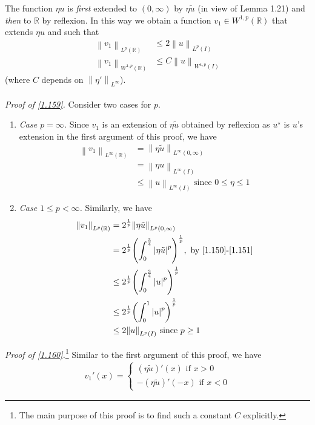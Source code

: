 \documentclass[a4paper,oneside]{article}
\numberwithin{equation}{section}
\begin{document}
The function $\eta u$ is \textit{first} extended to $\left(0,\infty\right)$ by $\eta \tilde{u}$ (in view of Lemma 1.21) and \textit{then} to $\mathbb{R}$ by reflexion. In this way we obtain a function $v_1\in W^{1,p}\left(\mathbb{R}\right)$ that extends $\eta u$ and such that
\begin{align}
\label{1.159}
{\left\| {{v_1}} \right\|_{{L^p}\left( \mathbb{R} \right)}} &\le 2{\left\| u \right\|_{{L^p}\left( I \right)}}\\
{\left\| {{v_1}} \right\|_{{W^{1,p}}\left( \mathbb{R} \right)}} &\le C{\left\| u \right\|_{{W^{1,p}}\left( I \right)}} \label{1.160}
\end{align}
(where $C$ depends on ${{{\left\| {\eta '} \right\|}_{{L^\infty }}}}$).\\
\\
\textit{Proof of \eqref{1.159}.} Consider two cases for $p$.
\begin{enumerate}
\item \textit{Case $p=\infty$.} Since $v_1$ is an extension of $\eta \tilde{u}$ obtained by reflexion as $u^{\star}$ is $u$'s extension in the first argument of this proof, we have 
\begin{align}
{\left\| {{v_1}} \right\|_{{L^\infty }\left( \mathbb{R} \right)}} &= {\left\| {\eta \tilde u} \right\|_{{L^\infty }\left( {0,\infty } \right)}}\\
 &= {\left\| {\eta u} \right\|_{{L^\infty }\left( I \right)}}\\
 &\le {\left\| u \right\|_{{L^\infty }\left( I \right)}}\mbox{ since } 0 \le \eta  \le 1
\end{align}
\item \textit{Case $1\le p <\infty$.}
Similarly, we have 
\begin{align}
{\left\| {{v_1}} \right\|_{{L^p}\left( \mathbb{R} \right)}} &= {2^{\frac{1}{p}}}{\left\| {\eta \tilde u} \right\|_{{L^p}\left( {0,\infty } \right)}}\\
& = {2^{\frac{1}{p}}}{\left( {\int_0^{\frac{3}{4}} {{{\left| {\eta \tilde u} \right|}^p}} } \right)^{\frac{1}{p}}},\mbox{ by \eqref{1.150}-\eqref{1.151}}\\
 &\le {2^{\frac{1}{p}}}{\left( {\int_0^{\frac{3}{4}} {{{\left| u \right|}^p}} } \right)^{\frac{1}{p}}}\\
 &\le {2^{\frac{1}{p}}}{\left( {\int_0^1 {{{\left| u \right|}^p}} } \right)^{\frac{1}{p}}}\\
 &\le 2{\left\| u \right\|_{{L^p}\left( I \right)}}\mbox{ since } p \ge 1
\end{align}
\end{enumerate}
\textit{Proof of \eqref{1.160}.}\footnote{The main purpose of this proof is to find such a constant $C$ explicitly.} Similar to the first argument of this proof, we have
\begin{align}
{v_1}'\left( x \right) = \left\{ {\begin{array}{*{20}{c}}
{\left( {\eta \tilde u} \right)'\left( x \right)\mbox{ if } x > 0}\\
{ - \left( {\eta \tilde u} \right)'\left( { - x} \right)\mbox{ if } x < 0}
\end{array}} \right.
\end{align}
\end{document}
